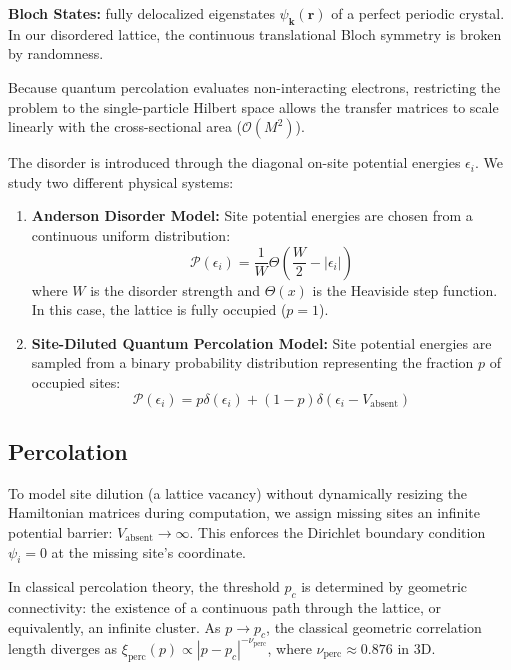 \textbf{Bloch States:} fully delocalized eigenstates $\psi_{\mathbf{k}}(\mathbf{r})$ of a perfect periodic crystal. In our disordered lattice, the continuous translational Bloch symmetry is broken by randomness.

Because quantum percolation evaluates non-interacting electrons, restricting the problem to the single-particle Hilbert space allows the transfer matrices to scale linearly with the cross-sectional area ($\mathcal{O}(M^2)$). 

The disorder is introduced through the diagonal on-site potential energies $\epsilon_i$. We study two different physical systems:
\begin{enumerate}
    \item \textbf{Anderson Disorder Model:} Site potential energies are chosen from a continuous uniform distribution:
    \begin{equation}
    \mathcal{P}(\epsilon_i) = \frac{1}{W} \Theta\left(\frac{W}{2} - |\epsilon_i|\right)
    \end{equation}
    where $W$ is the disorder strength and $\Theta(x)$ is the Heaviside step function. In this case, the lattice is fully occupied ($p=1$).
    \item \textbf{Site-Diluted Quantum Percolation Model:} Site potential energies are sampled from a binary probability distribution representing the fraction $p$ of occupied sites:
    \begin{equation}
    \mathcal{P}(\epsilon_i) = p \delta(\epsilon_i) + (1-p) \delta(\epsilon_i - V_{\text{absent}})
    \end{equation}
\end{enumerate}

\subsection{Percolation}

To model site dilution (a lattice vacancy) without dynamically resizing the Hamiltonian matrices during computation, we assign missing sites an infinite potential barrier: $V_{\text{absent}} \to \infty$. This enforces the Dirichlet boundary condition $\psi_i = 0$ at the missing site's coordinate. 

In classical percolation theory, the threshold $p_c$ is determined by geometric connectivity: the existence of a continuous path through the lattice, or equivalently, an infinite cluster. As $p \to p_c$, the classical geometric correlation length diverges as $\xi_{\text{perc}}(p) \propto |p - p_c|^{-\nu_{\text{perc}}}$, where $\nu_{\text{perc}} \approx 0.876$ in 3D. 

